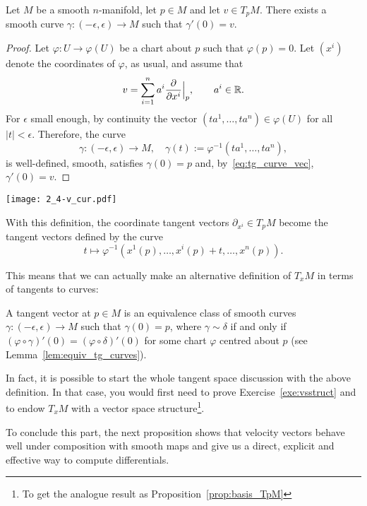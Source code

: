 \begin{theorem}
  Let $M$ be a smooth $n$-manifold, let $p\in M$ and let $v\in T_pM$.
  There exists a smooth curve $\gamma: (-\epsilon,\epsilon) \to M$ such that $\gamma'(0) = v$.
\end{theorem}
\begin{proof}
  Let $\varphi:U\to\varphi(U)$ be a chart about $p$ such that $\varphi(p)=0$.
  Let $(x^i)$ denote the coordinates of $\varphi$, as usual, and assume that
  \begin{equation}
    v = \sum_{i=1}^n a^i \frac{\partial}{\partial x^i}\Big|_p, \qquad a^i \in\mathbb{R}.
  \end{equation}
  For $\epsilon$ small enough, by continuity the vector $(ta^1, \ldots, ta^n) \in \varphi(U)$ for all $|t|<\epsilon$. Therefore, the curve
  \begin{equation}
    \gamma: (-\epsilon, \epsilon) \to M, \quad \gamma(t):=\varphi^{-1}(ta^1, \ldots, ta^n),
  \end{equation}
  is well-defined, smooth, satisfies $\gamma(0) = p$ and, by~\eqref{eq:tg_curve_vec}, $\gamma'(0) = v$.
\end{proof}

\begin{marginfigure}
  \texttt{[image: 2\_4-v\_cur.pdf]}
  \caption{With this definition, the coordinate tangent vectors $\partial_{x^i}\in T_p M$ become the tangent vectors defined by the curve \[t \mapsto \varphi^{-1}(x^1(p), \ldots, {x^i(p) + t}, \ldots, x^n(p)).\]}
  \label{fig:2_4-v_cur}
\end{marginfigure}
This means that we can actually make an alternative definition of $T_xM$ in terms of tangents to curves:
\begin{definition}\label{def:tg:ascurvespeed}
  A tangent vector at $p\in M$ is an equivalence class of smooth curves $\gamma:(-\epsilon, \epsilon)\to M$ such that $\gamma(0)=p$, where $\gamma\sim\delta$ if and only if $(\varphi\circ \gamma)'(0) = (\varphi\circ\delta)'(0)$ for some chart $\varphi$ centred about $p$ (see Lemma~\ref{lem:equiv_tg_curves}).
\end{definition}

In fact, it is possible to start the whole tangent space discussion with the above definition. In that case, you would first need to prove Exercise~\ref{exe:vsstruct} and to endow $T_xM$ with a vector space structure\footnote{To get the analogue result as Proposition~\ref{prop:basis_TpM}}.

To conclude this part, the next proposition shows that velocity vectors behave well under composition with smooth maps and give us a direct, explicit and effective way to compute differentials.


